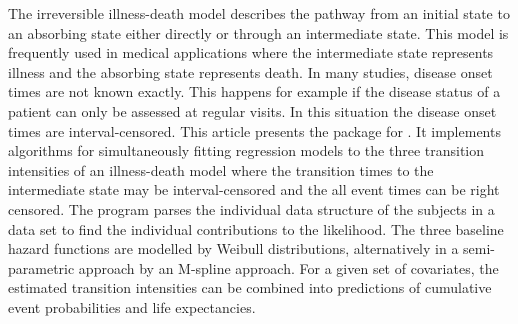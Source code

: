 The irreversible illness-death model describes the pathway from an
initial state to an absorbing state either directly or through an
intermediate state. This model is frequently used in medical
applications where the intermediate state represents illness and the
absorbing state represents death. In many studies, disease onset times
are not known exactly. This happens for example if the disease status
of a patient can only be assessed at regular visits. In this situation
the disease onset times are interval-censored. This article presents
the  package for . It implements
algorithms for simultaneously fitting regression models to the three
transition intensities of an illness-death model where the transition
times to the intermediate state may be interval-censored and the all
event times can be right censored. The program parses the individual
data structure of the subjects in a data set to find the individual
contributions to the likelihood. The three baseline hazard functions
are modelled by Weibull distributions, alternatively in a
semi-parametric approach by an M-spline approach. For a given set of
covariates, the estimated transition intensities can be combined into
predictions of cumulative event probabilities and life expectancies.
